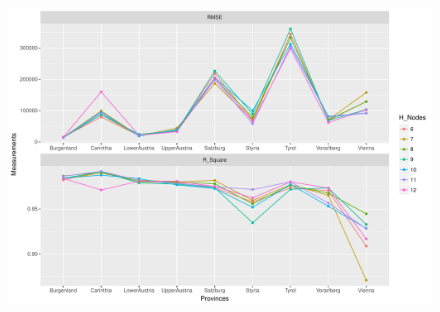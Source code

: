\documentclass[a4paper,reqno,]{article}
\begin{document}
\begin{enumerate}
\begin{figure}[H]
\begin{minipage}[b]{0.9\textwidth}
\centering
  \includegraphics[width=1\textwidth]{images/ANN/dnh_new.pdf}
       \label{fig:dhn_neural}
\end{minipage}
\end{figure}


\end{enumerate}
\end{document}
